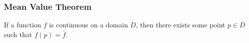 \subsubsection{Mean Value Theorem}
\begin{theorem}
	If a function $f$ is continuous on a domain $D$, then there exists some point $p \in D$ such that $f(p) = \bar{f}$.
\end{theorem}